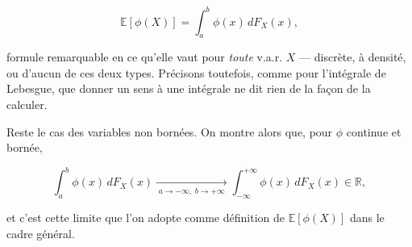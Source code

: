 $$
\mathbb{E}[\phi(X)] = \int_a^b \phi(x)\, dF_X(x),
$$

formule remarquable en ce qu'elle vaut pour \emph{toute} v.a.r. $X$ — discrète, à densité, ou d'aucun de ces deux types. Précisons toutefois, comme pour l'intégrale de Lebesgue, que donner un sens à une intégrale ne dit rien de la façon de la calculer.

Reste le cas des variables non bornées. On montre alors que, pour $\phi$ continue et bornée,

$$
\int_a^b \phi(x)\, dF_X(x) \xrightarrow[\;a \to -\infty,\; b \to +\infty\;]{} \int_{-\infty}^{+\infty} \phi(x)\, dF_X(x) \in \mathbb{R},
$$

et c'est cette limite que l'on adopte comme définition de $\mathbb{E}[\phi(X)]$ dans le cadre général.

